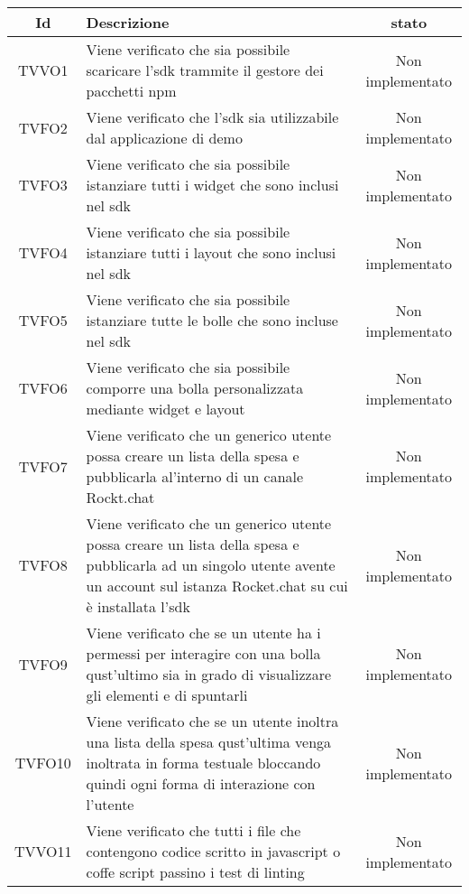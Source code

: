 \begin{center}
	\begin{longtable}{|c|>{\centering}m{10cm}|c|}\hline
		Id & Descrizione & stato \\ \hline
		TVVO1 & Viene verificato che sia possibile scaricare l'sdk trammite il gestore dei pacchetti npm & Non implementato \\ \hline
		TVFO2 & Viene verificato che l'sdk sia utilizzabile dal applicazione di demo & Non implementato \\ \hline
		TVFO3 & Viene verificato che sia possibile istanziare tutti i widget che sono inclusi nel sdk & Non implementato \\ \hline
		TVFO4 & Viene verificato che sia possibile istanziare tutti i layout che sono inclusi nel sdk & Non implementato \\ \hline
		TVFO5 & Viene verificato che sia possibile istanziare tutte le bolle che sono incluse nel sdk & Non implementato \\ \hline
		TVFO6 & Viene verificato che sia possibile comporre una bolla personalizzata mediante widget e layout & Non implementato \\ \hline
		TVFO7 & Viene verificato che un generico utente possa creare un lista della spesa e pubblicarla al'interno di un canale Rockt.chat & Non implementato \\ \hline
		TVFO8 & Viene verificato che un generico utente possa creare un lista della spesa e pubblicarla ad un singolo utente avente un account sul istanza Rocket.chat su cui è installata l'sdk & Non implementato \\ \hline
		TVFO9 & Viene verificato che se un utente ha i permessi per interagire con una bolla qust'ultimo sia in grado di visualizzare gli elementi e di spuntarli & Non implementato \\ \hline
		TVFO10 & Viene verificato che se un utente inoltra una lista della spesa qust'ultima venga inoltrata in forma testuale bloccando quindi ogni forma di interazione con l'utente & Non implementato \\ \hline
		TVVO11 & Viene  verificato che tutti i file che contengono codice scritto in javascript o coffe script passino i test di linting & Non implementato \\ \hline
	\end{longtable}
\end{center}
